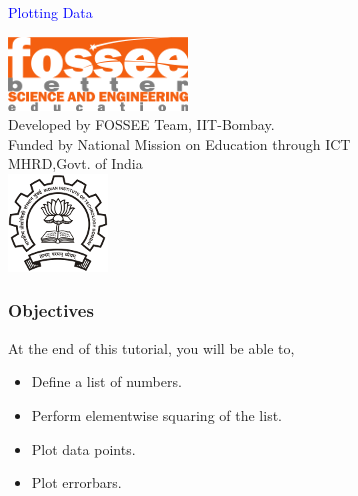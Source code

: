 \documentclass[presentation]{beamer}
\title{}
\author{FOSSEE}
\date{}
\begin{document}
\begin{frame}

\begin{center}
\vspace{12pt}
\textcolor{blue}{\huge Plotting Data}
\end{center}
\vspace{18pt}
\begin{center}
\vspace{10pt}
\includegraphics[scale=0.95]{../images/fossee-logo.png}\\
\vspace{5pt}
\scriptsize Developed by FOSSEE Team, IIT-Bombay. \\ 
\scriptsize Funded by National Mission on Education through ICT\\
\scriptsize  MHRD,Govt. of India\\
\includegraphics[scale=0.30]{../images/iitb-logo.png}\\
\end{center}
\end{frame}
\begin{frame}
\frametitle{Objectives}
\label{sec-2}

  At the end of this tutorial, you will be able to,

\begin{itemize}
\item Define a list of numbers.
\item Perform elementwise squaring of the list.
\item Plot data points.
\item Plot errorbars.
\end{itemize}
  
\end{frame}
\end{document}
